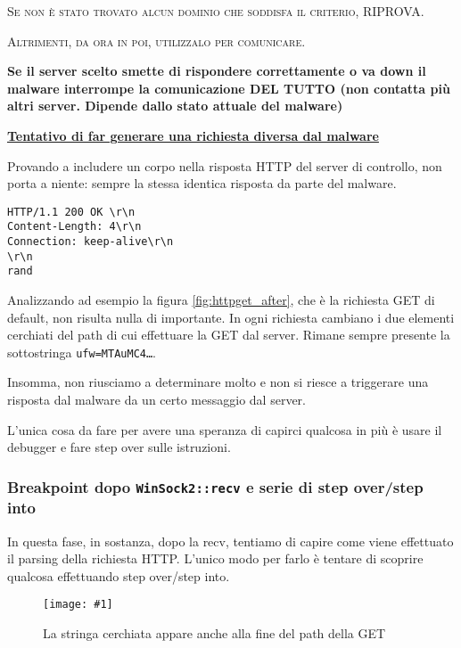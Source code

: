 \documentclass[
    a4paper, %
    11pt %
]{article}
\newcommand{\pic}[4]{\begin{figure}[H]
            \centering
            \texttt{[image: \#1]}
            \caption{#2}
            \label{fig:#1}
            \end{figure}}
\begin{document}
            \textsc{Se non è stato trovato alcun dominio che soddisfa il criterio, RIPROVA.}
            
            \textsc{Altrimenti, da ora in poi, utilizzalo per comunicare.}
            
            \textbf{Se il server scelto smette di rispondere correttamente o va down il malware interrompe la 
            comunicazione DEL TUTTO (non contatta più altri server. Dipende dallo stato attuale del malware)}

            \underline{\textbf{Tentativo di far generare una richiesta diversa dal malware}}

            Provando a includere un corpo nella risposta HTTP del server di controllo, non porta a niente: sempre la stessa identica
            risposta da parte del malware.

            \begin{lstlisting}
HTTP/1.1 200 OK \r\n
Content-Length: 4\r\n
Connection: keep-alive\r\n
\r\n
rand
            \end{lstlisting}

            Analizzando ad esempio la figura \ref{fig:httpget_after}, che è la richiesta GET di default,
            non risulta nulla di importante. In ogni richiesta cambiano i due elementi cerchiati del path
            di cui effettuare la GET dal server. Rimane sempre presente la sottostringa \texttt{ufw=MTAuMC4\dots}.

            Insomma, non riusciamo a determinare molto e non si riesce a triggerare una risposta dal malware da
            un certo messaggio dal server.

            L'unica cosa da fare per avere una speranza di capirci qualcosa in più è usare il debugger e fare
            step over sulle istruzioni.

            \pagebreak

            \subsubsection{Breakpoint dopo \texttt{WinSock2::recv} e serie di step over/step into}

            In questa fase, in sostanza, dopo la recv, tentiamo di capire come viene effettuato il parsing della
            richiesta HTTP. L'unico modo per farlo è tentare di scoprire qualcosa effettuando step over/step into.

            \pic{brkp_after_recv}{La stringa cerchiata appare anche alla fine del path della GET}{15cm}{8cm}
\end{document}
